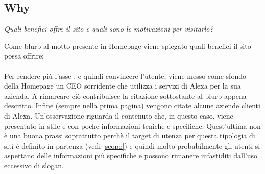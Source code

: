 \subsection{Why}
\begin{center}

\textit{Quali benefici offre il sito e quali sono le motivazioni per visitarlo?}

\end{center}
\begin{flushleft}
Come blurb al motto presente in Homepage viene spiegato quali benefici il sito 
possa offrire: \\
\\
Per rendere più  l'asse , e quindi convincere l'utente,
viene messo come sfondo della Homepage un CEO sorridente che utilizza i servizi di Alexa
per la sua azienda. A rimarcare ciò contribuisce la citazione sottostante al 
blurb appena descritto. Infine (sempre nella prima pagina)
vengono citate alcune aziende clienti di Alexa. Un'osservazione riguarda il contenuto
che, in questo caso, viene presentato in stile  e con poche informazioni
teniche e specifiche. Quest'ultima non è una buona prassi soprattutto perchè il target di utenza
per questa tipologia di siti è definito in partenza (vedi \ref{scopo}) e quindi
molto probabilmente gli utenti si aspettano delle informazioni più specifiche 
e possono rimanere infastiditi dall'uso eccessivo di slogan.

\end{flushleft}